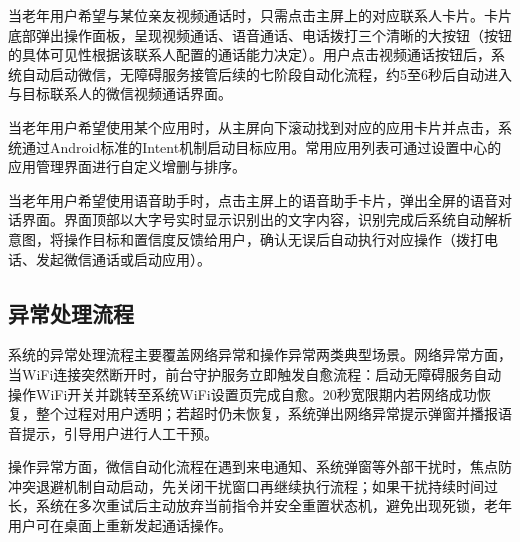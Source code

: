 当老年用户希望与某位亲友视频通话时，只需点击主屏上的对应联系人卡片。卡片底部弹出操作面板，呈现视频通话、语音通话、电话拨打三个清晰的大按钮（按钮的具体可见性根据该联系人配置的通话能力决定）。用户点击视频通话按钮后，系统自动启动微信，无障碍服务接管后续的七阶段自动化流程，约5至6秒后自动进入与目标联系人的微信视频通话界面。

当老年用户希望使用某个应用时，从主屏向下滚动找到对应的应用卡片并点击，系统通过Android标准的Intent机制启动目标应用。常用应用列表可通过设置中心的应用管理界面进行自定义增删与排序。

当老年用户希望使用语音助手时，点击主屏上的语音助手卡片，弹出全屏的语音对话界面。界面顶部以大字号实时显示识别出的文字内容，识别完成后系统自动解析意图，将操作目标和置信度反馈给用户，确认无误后自动执行对应操作（拨打电话、发起微信通话或启动应用）。

\subsection{异常处理流程}

系统的异常处理流程主要覆盖网络异常和操作异常两类典型场景。网络异常方面，当WiFi连接突然断开时，前台守护服务立即触发自愈流程：启动无障碍服务自动操作WiFi开关并跳转至系统WiFi设置页完成自愈。20秒宽限期内若网络成功恢复，整个过程对用户透明；若超时仍未恢复，系统弹出网络异常提示弹窗并播报语音提示，引导用户进行人工干预。

操作异常方面，微信自动化流程在遇到来电通知、系统弹窗等外部干扰时，焦点防冲突退避机制自动启动，先关闭干扰窗口再继续执行流程；如果干扰持续时间过长，系统在多次重试后主动放弃当前指令并安全重置状态机，避免出现死锁，老年用户可在桌面上重新发起通话操作。

